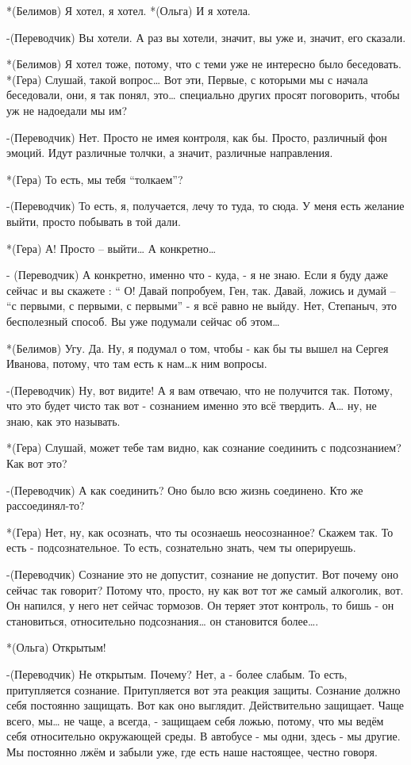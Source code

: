 *(Белимов) Я хотел, я хотел.
*(Ольга) И я хотела.

-(Переводчик) Вы хотели. А раз вы хотели, значит, вы уже и, значит, его сказали.

*(Белимов) Я хотел тоже, потому, что с теми уже не интересно было беседовать.
*(Гера) Слушай, такой вопрос… Вот эти, Первые, с которыми мы с начала беседовали, они, я так понял, это… специально других просят поговорить, чтобы уж не надоедали мы им?

-(Переводчик) Нет. Просто не имея контроля, как бы. Просто, различный фон эмоций. Идут различные толчки, а значит, различные направления.

*(Гера) То есть, мы тебя “толкаем”?

-(Переводчик) То есть, я, получается, лечу то туда, то сюда. У меня есть желание выйти, просто побывать в той дали.

*(Гера) А! Просто – выйти… А конкретно…

 - (Переводчик) А конкретно, именно что -  куда, - я не знаю. Если я буду даже сейчас  и вы скажете : “ О! Давай попробуем, Ген, так. Давай, ложись и думай – “с первыми, с первыми, с первыми” - я всё равно не выйду. Нет, Степаныч, это бесполезный способ.  Вы уже подумали сейчас об этом… 

*(Белимов) Угу. Да. Ну, я подумал о том, чтобы - как бы ты вышел на Сергея Иванова, потому, что там есть к нам…к ним вопросы. 

-(Переводчик) Ну, вот видите! А я вам отвечаю, что не получится так. Потому, что это будет чисто так вот - сознанием именно это всё твердить. А… ну, не знаю, как это называть.

*(Гера) Слушай, может тебе там видно, как сознание соединить с подсознанием? Как вот это?

-(Переводчик) А как соединить? Оно было всю жизнь соединено. Кто же рассоединял-то?

*(Гера) Нет, ну, как осознать, что ты осознаешь неосознанное? Скажем так. То есть - подсознательное. То есть, сознательно знать, чем ты оперируешь. 

-(Переводчик) Сознание это не допустит, сознание не допустит. Вот почему оно сейчас так говорит? Потому что, просто, ну как вот тот же самый алкоголик, вот.  Он напился, у него нет сейчас тормозов. Он теряет этот контроль, то бишь -  он становиться, относительно подсознания… он становится более….

*(Ольга) Открытым!

-(Переводчик) Не открытым. Почему? Нет, а - более слабым. То есть, притупляется сознание. Притупляется вот эта реакция защиты. Сознание должно себя постоянно защищать. Вот как оно выглядит. Действительно защищает. Чаще всего, мы… не чаще, а всегда, - защищаем себя ложью, потому, что мы ведём себя относительно окружающей среды. В автобусе - мы одни, здесь - мы другие. Мы постоянно лжём и забыли уже, где есть наше настоящее, честно говоря.

